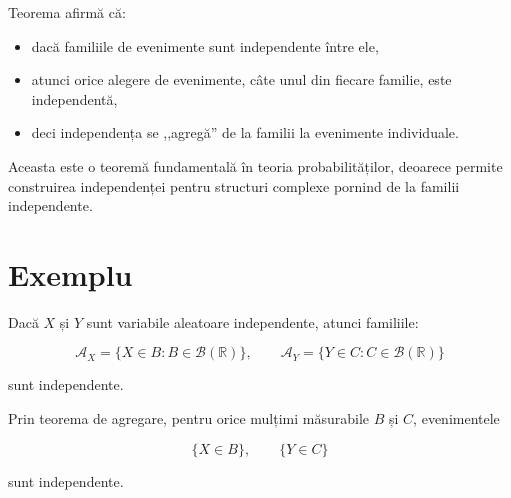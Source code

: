 \documentclass[12pt]{article}
\theoremstyle{plain}
\begin{document}
Teorema afirmă că:

\begin{itemize}
    \item dacă familiile de evenimente sunt independente între ele,
    \item atunci orice alegere de evenimente, câte unul din fiecare familie,
          este independentă,
    \item deci independența se ,,agregă'' de la familii la evenimente individuale.
\end{itemize}

Aceasta este o teoremă fundamentală în teoria probabilităților, deoarece
permite construirea independenței pentru structuri complexe pornind de la
familii independente.

\section{Exemplu}

Dacă $X$ și $Y$ sunt variabile aleatoare independente, atunci familiile:


\[
\mathcal{A}_X = \{ X \in B : B \in \mathcal{B}(\mathbb{R}) \}, \qquad
\mathcal{A}_Y = \{ Y \in C : C \in \mathcal{B}(\mathbb{R}) \}
\]


sunt independente.

Prin teorema de agregare, pentru orice mulțimi măsurabile $B$ și $C$,
evenimentele


\[
\{X \in B\}, \qquad \{Y \in C\}
\]


sunt independente.
\end{document}
